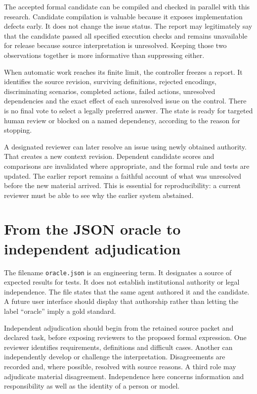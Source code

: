 \documentclass[12pt,a4paper,oneside,openany]{book}
\begin{document}
The accepted formal candidate can be compiled and checked in parallel with this
research. Candidate compilation is valuable because it exposes implementation
defects early. It does not change the issue status. The report may legitimately
say that the candidate passed all specified execution checks and remains
unavailable for release because source interpretation is unresolved. Keeping
those two observations together is more informative than suppressing either.

When automatic work reaches its finite limit, the controller freezes a report.
It identifies the source revision, surviving definitions, rejected encodings,
discriminating scenarios, completed actions, failed actions, unresolved
dependencies and the exact effect of each unresolved issue on the control.
There is no final vote to select a legally preferred answer. The state is ready
for targeted human review or blocked on a named dependency, according to the
reason for stopping.

A designated reviewer can later resolve an issue using newly obtained authority.
That creates a new context revision. Dependent candidate scores and comparisons
are invalidated where appropriate, and the formal rule and tests are updated.
The earlier report remains a faithful account of what was unresolved before the
new material arrived. This is essential for reproducibility: a current reviewer
must be able to see why the earlier system abstained.

\section{From the JSON oracle to independent adjudication}
\label{merge:M02:08}

\label{sec:circular-independent}
The filename \texttt{oracle.json} is an engineering term. It designates a source
of expected results for tests. It does not establish institutional authority or
legal independence. The file states that the same agent authored it and the
candidate. A future user interface should display that authorship rather than
letting the label ``oracle'' imply a gold standard.

Independent adjudication should begin from the retained source packet and
declared task, before exposing reviewers to the proposed formal expression.
One reviewer identifies requirements, definitions and difficult cases. Another
can independently develop or challenge the interpretation. Disagreements are
recorded and, where possible, resolved with source reasons. A third role may
adjudicate material disagreement. Independence here concerns information and
responsibility as well as the identity of a person or model.
\end{document}
